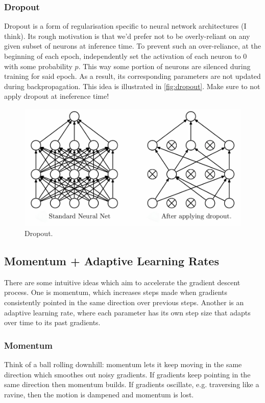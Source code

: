 \documentclass[11pt]{article}
\begin{document}
\subsubsection{Dropout} Dropout is a form of regularisation specific to neural network architectures (I think). Its rough motivation is that we'd prefer not to be overly-reliant on any given subset of neurons at inference time. To prevent such an over-reliance, at the beginning of each epoch, independently set the activation of each neuron to 0 with some probability $p$. This way some portion of neurons are silenced during training for said epoch. As a result, its corresponding parameters are not updated during backpropagation. This idea is illustrated in \autoref{fig:dropout}. Make sure to not apply dropout at ineference time!

\begin{figure}[t]
    \centering
    \includegraphics[width=\textwidth]{./figures/neural_nets/REG_dropout.pdf}
    \caption{Dropout.}
    \label{fig:dropout}
\end{figure}

\subsection{Momentum + Adaptive Learning Rates}
There are some intuitive ideas which aim to accelerate the gradient descent process. One is momentum, which increases steps made when gradients consistently pointed in the same direction over previous steps. Another is an adaptive learning rate, where each parameter has its own step size that adapts over time to its past gradients.

\subsubsection{Momentum}
Think of a ball rolling downhill: momentum lets it keep moving in the same direction which smoothes out noisy gradients. If gradients keep pointing in the same direction then momentum builds. If gradients oscillate, e.g. traversing like a ravine, then the motion is dampened and momentum is lost.
\end{document}
